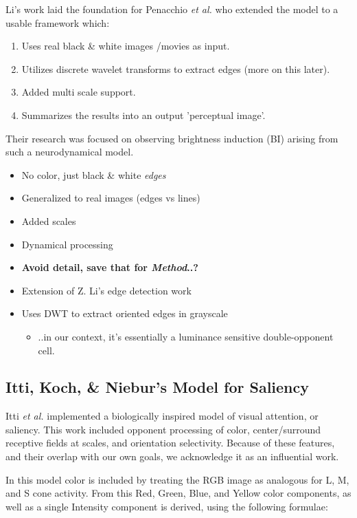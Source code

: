 \documentclass[journal,onecolumn]{IEEEtran}
\begin{document}
Li's work laid the foundation for Penacchio \textit{et al.} who extended the model to a usable framework which:
\begin{enumerate}
    \item Uses real black \& white images /movies as input.
    \item Utilizes discrete wavelet transforms to extract edges (more on this later).
    \item Added multi scale support.
    \item Summarizes the results into an output 'perceptual image'.
\end{enumerate}
Their research was focused on observing brightness induction (BI) arising from such a neurodynamical model.
\begin{itemize}
    \item No color, just black \& white \textit{edges}
    \item Generalized to real images (edges vs lines)
    \item Added scales
    \item Dynamical processing
    \item \textbf{Avoid detail, save that for \textit{Method}..?}
    \item Extension of Z. Li's edge detection work
    \item Uses DWT to extract oriented edges in grayscale
    \begin{itemize}
        \item ..in our context, it's essentially a luminance sensitive double-opponent cell.
    \end{itemize}
\end{itemize}

\subsection*{Itti, Koch, \& Niebur's Model for Saliency \cite{itti:1998}}

Itti \textit{et al.} implemented a biologically inspired model of visual attention, or saliency. This work included opponent processing of color, center/surround receptive fields at scales, and orientation selectivity. Because of these features, and their overlap with our own goals, we acknowledge it as an influential work.

In this model color is included by treating the RGB image as analogous for L, M, and S cone activity. From this Red, Green, Blue, and Yellow color components, as well as a single Intensity component is derived, using the following formulae:
\end{document}
